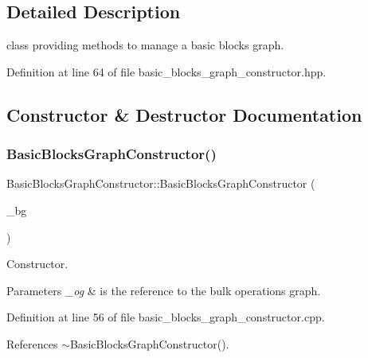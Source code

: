 \subsection{Detailed Description}
class providing methods to manage a basic blocks graph. 

Definition at line 64 of file basic\+\_\+blocks\+\_\+graph\+\_\+constructor.\+hpp.



\subsection{Constructor \& Destructor Documentation}
\mbox{\label{classBasicBlocksGraphConstructor_a322811f80dc48d4aa33e5e94381876f1}} 
\subsubsection{\texorpdfstring{Basic\+Blocks\+Graph\+Constructor()}{BasicBlocksGraphConstructor()}}
{\footnotesize\ttfamily Basic\+Blocks\+Graph\+Constructor\+::\+Basic\+Blocks\+Graph\+Constructor (\begin{DoxyParamCaption}\item[{\hyperlink{basic__block_8hpp_ab2c15dfa325570d7a3e0e364c2f5fdfa}{B\+B\+Graphs\+Collection\+Ref}}]{\+\_\+bg }\end{DoxyParamCaption})\hspace{0.3cm}{\ttfamily [explicit]}}



Constructor. 


\begin{DoxyParams}{Parameters}
{\em \+\_\+og} & is the reference to the bulk operations graph. \\
\hline
\end{DoxyParams}


Definition at line 56 of file basic\+\_\+blocks\+\_\+graph\+\_\+constructor.\+cpp.



References $\sim$\+Basic\+Blocks\+Graph\+Constructor().

